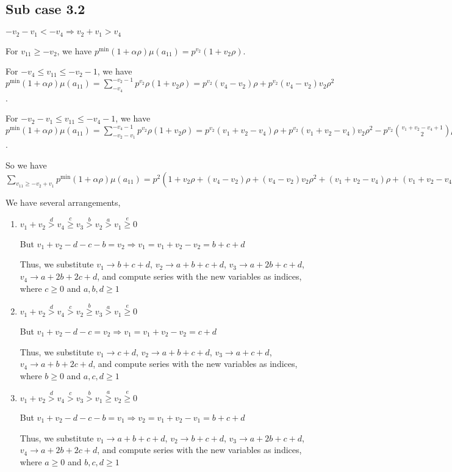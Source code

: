 \documentclass{article}
\begin{document}
\subsection{Sub case 3.2}
$-v_2-v_1<{-v_4}\Rightarrow{v_2+v_1>{v_4}}$

For $v_{11}\geq{-v_2}$, we have $p^{\min}(1+\alpha\rho)\mu(a_{11})=p^{v_2}(1+v_2\rho)$.

For $-v_4\leq{v_{11}}\leq{-v_2-1}$, we have $p^{\min}(1+\alpha\rho)\mu(a_{11})=\sum_{-v_4}^{-v_2-1}p^{v_2}\rho(1+v_2\rho)=p^{v_2}(v_4-v_2)\rho+p^{v_2}(v_4-v_2)v_2\rho^2$.

For $-v_2-v_1\leq{v_{11}}\leq{-v_4-1}$, we have $p^{\min}(1+\alpha\rho)\mu(a_{11})=\sum_{-v_2-v_1}^{-v_4-1}p^{v_2}\rho(1+v_2\rho)=p^{v_2}(v_1+v_2-v_4)\rho+p^{v_2}(v_1+v_2-v_4)v_2\rho^2-p^{v_2}\binom{v_1+v_2-v_4+1}{2}\rho^2$.

So we have $\sum_{v_{11}\geq{-v_2+v_1}}p^{\min}(1+\alpha\rho)\mu(a_{11})=p^{2}(1+v_2\rho+(v_4-v_2)\rho+(v_4-v_2)v_2\rho^2+(v_1+v_2-v_4)\rho+(v_1+v_2-v_4)v_2\rho^2-\frac{(v_1+v_2-v_4+1)(v_1+v_2-v_4)}{2}\rho^2)$

We have several arrangements,

\begin{enumerate}
\item 
$v_1+v_2\overset{d}{>}v_4\overset{c}{\geq}v_3\overset{b}{>}{v_2}\overset{a}{>}v_1\overset{e}{\geq}{0}$

But $v_1+v_2-d-c-b=v_2\Rightarrow{v_1=v_1+v_2-v_2=b+c+d}$

Thus, we substitute $v_1\rightarrow{b+c+d}$, $v_2\rightarrow{a+b+c+d}$, $v_3\rightarrow{a+2b+c+d}$, $v_4\rightarrow{a+2b+2c+d}$, and compute series with the new variables as indices, where $c\geq{0}$ and $a,b,d\geq{1}$

\item 
$v_1+v_2\overset{d}{>}v_4\overset{c}{>}v_2\overset{b}{\geq}{v_3}\overset{a}{>}v_1\overset{e}{\geq}{0}$

But $v_1+v_2-d-c=v_2\Rightarrow{v_1=v_1+v_2-v_2=c+d}$

Thus, we substitute $v_1\rightarrow{c+d}$, $v_2\rightarrow{a+b+c+d}$, $v_3\rightarrow{a+c+d}$, $v_4\rightarrow{a+b+2c+d}$, and compute series with the new variables as indices, where $b\geq{0}$ and $a,c,d\geq{1}$

\item 
$v_1+v_2\overset{d}{>}v_4\overset{c}{>}v_3\overset{b}{>}{v_1}\overset{a}{\geq}v_2\overset{e}{\geq}{0}$

But $v_1+v_2-d-c-b=v_1\Rightarrow{v_2=v_1+v_2-v_1=b+c+d}$

Thus, we substitute $v_1\rightarrow{a+b+c+d}$, $v_2\rightarrow{b+c+d}$, $v_3\rightarrow{a+2b+c+d}$, $v_4\rightarrow{a+2b+2c+d}$, and compute series with the new variables as indices, where $a\geq{0}$ and $b,c,d\geq{1}$
\end{enumerate}
\end{document}
